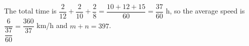 The total time is $\dfrac{2}{12}+\dfrac{2}{10}+\dfrac{2}{8}=\dfrac{10+12+15}{60}=\dfrac{37}{60}$ h, so the average speed is $\dfrac{6}{\dfrac{37}{60}}=\dfrac{360}{37}$ km/h and $m+n=\boxed{397}$.
